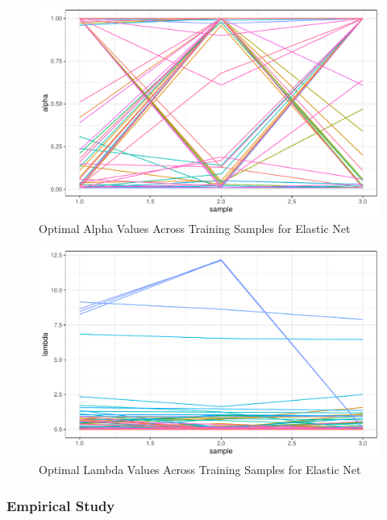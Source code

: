 \documentclass[11pt, a4paper, table]{article}
\begin{document}

\begin{figure}
	\includegraphics{eln_alpha_plot.pdf}
	\caption{Optimal Alpha Values Across Training Samples for Elastic Net}
\end{figure}

\begin{figure}
	\includegraphics{eln_lambda_plot.pdf}
	\caption{Optimal Lambda Values Across Training Samples for Elastic Net}
\end{figure}

\newpage

\subsubsection{Empirical Study}
\end{document}

